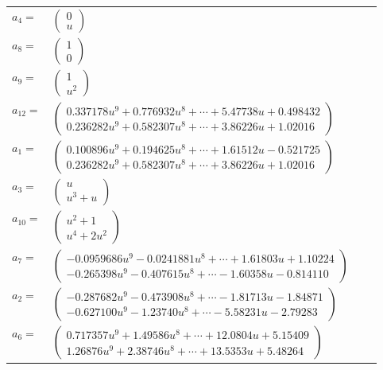 \documentclass[1p]{elsarticle_modified}
\theoremstyle{definition}
\begin{document}
\begin{tabular}{m{7pt} m{180pt} m{7pt} m{180pt} }
\flushright $a_{4}=$&$\begin{pmatrix}0\\u\end{pmatrix}$ \\
\flushright $a_{8}=$&$\begin{pmatrix}1\\0\end{pmatrix}$ \\
\flushright $a_{9}=$&$\begin{pmatrix}1\\u^2\end{pmatrix}$ \\
\flushright $a_{12}=$&$\begin{pmatrix}0.337178 u^{9}+0.776932 u^{8}+\cdots+5.47738 u+0.498432\\0.236282 u^{9}+0.582307 u^{8}+\cdots+3.86226 u+1.02016\end{pmatrix}$ \\
\flushright $a_{1}=$&$\begin{pmatrix}0.100896 u^{9}+0.194625 u^{8}+\cdots+1.61512 u-0.521725\\0.236282 u^{9}+0.582307 u^{8}+\cdots+3.86226 u+1.02016\end{pmatrix}$ \\
\flushright $a_{3}=$&$\begin{pmatrix}u\\u^3+u\end{pmatrix}$ \\
\flushright $a_{10}=$&$\begin{pmatrix}u^2+1\\u^4+2 u^2\end{pmatrix}$ \\
\flushright $a_{7}=$&$\begin{pmatrix}-0.0959686 u^{9}-0.0241881 u^{8}+\cdots+1.61803 u+1.10224\\-0.265398 u^{9}-0.407615 u^{8}+\cdots-1.60358 u-0.814110\end{pmatrix}$ \\
\flushright $a_{2}=$&$\begin{pmatrix}-0.287682 u^{9}-0.473908 u^{8}+\cdots-1.81713 u-1.84871\\-0.627100 u^{9}-1.23740 u^{8}+\cdots-5.58231 u-2.79283\end{pmatrix}$ \\
\flushright $a_{6}=$&$\begin{pmatrix}0.717357 u^{9}+1.49586 u^{8}+\cdots+12.0804 u+5.15409\\1.26876 u^{9}+2.38746 u^{8}+\cdots+13.5353 u+5.48264\end{pmatrix}$ \\

\end{tabular}
\end{document}
